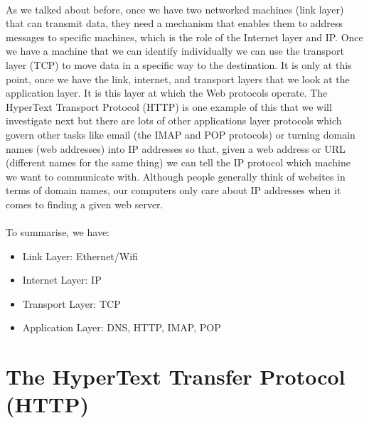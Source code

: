 \documentclass[12pt, a4paper, oneside]{book}
\begin{document}
\paragraph{} As we talked about before, once we have two networked machines (link layer) that can transmit data, they need a mechanism that enables them to address messages to specific machines, which is the role of the Internet layer and IP. Once we have a machine that we can identify individually we can use the transport layer (TCP) to move data in a specific way to the destination. It is only at this point, once we have the link, internet, and transport layers that we look at the application layer. It is this layer at which the Web protocols operate. The HyperText Transport Protocol (HTTP) is one example of this that we will investigate next but there are lots of other applications layer protocols which govern other tasks like email (the IMAP and POP protocols) or turning domain names (web addresses) into IP addresses so that, given a web address or URL (different names for the same thing) we can tell the IP protocol which machine we want to communicate with. Although people generally think of websites in terms of domain names, our computers only care about IP addresses when it comes to finding a given web server.
\paragraph{} To summarise, we have:
\begin{itemize}
\item Link Layer: Ethernet/Wifi
\item Internet Layer: IP
\item Transport Layer: TCP
\item Application Layer: DNS, HTTP, IMAP, POP 
\end{itemize}


\section{The HyperText Transfer Protocol (HTTP)}
\end{document}
